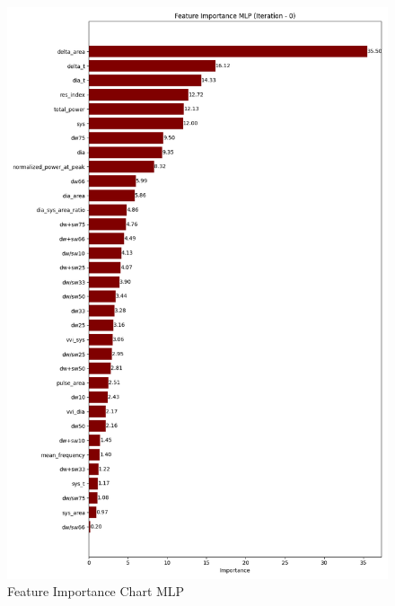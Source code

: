 \begin{figure}[h]
    \centering
    \vspace{-1cm}
    \hspace{-2cm}
    \includegraphics[width=\textwidth]{images/results/feature_importance/feature_importance_plot_MLP_0}
    \caption{Feature Importance Chart MLP}
    \label{fig:fi_mlp}
\end{figure}

